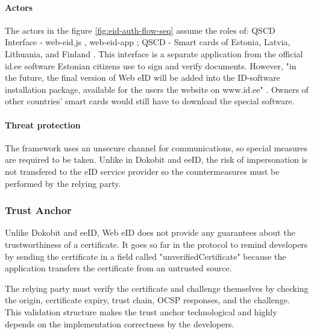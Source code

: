 \paragraph{Actors}

The actors in the figure \ref{fig:eid-auth-flow-seq} assume the roles of: QSCD Interface - web-eid.js \cite{ria-webeid-source-web-eid-js}, web-eid-app \cite{ria-webeid-source-web-eid-app}; QSCD - Smart cards of Estonia, Latvia, Lithuania, and Finland \cite{ria-webeid}. This interface is a separate application from the official id.ee software Estonian citizens use to sign and verify documents. However, "in the future, the final version of Web eID will be added into the ID-software installation package, available for the users the website on www.id.ee" \cite{ria-webeid}. Owners of other countries' smart cards would still have to download the special software.

\paragraph{Threat protection}

The framework uses an unsecure channel for communications, so special measures are required to be taken. Unlike in Dokobit and eeID, the risk of impersonation is not transfered to the eID service provider so the countermeasures must be performed by the relying party.


\subsubsection{Trust Anchor}

Unlike Dokobit and eeID, Web eID does not provide any guarantees about the trustworthiness of a certificate. It goes so far in the protocol to remind developers by sending the certificate in a field called "unverifiedCertificate" \cite{ria-webeid-source-web-eid-authtoken-validation-java-readme} because the application transfers the certificate from an untrusted source.

The relying party must verify the certificate and challenge themselves by checking the origin, certificate expiry, trust chain, OCSP responses, and the challenge. This validation structure makes the trust anchor technological and highly depends on the implementation correctness by the developers.

